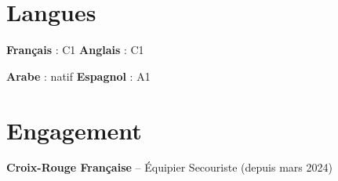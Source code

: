\documentclass[10pt,a4paper]{article}
\newenvironment{resume_list}{\vspace{-2pt}\begin{itemize}[itemsep=0.3pt,parsep=0pt,topsep=0.3pt,leftmargin=18pt]}{\end{itemize}\vspace{-2pt}}
\begin{document}
\vspace{1pt}
\begin{minipage}[t]{0.48\textwidth}
\section{Langues}
\begin{resume_list}
  \item \textbf{Français} : C1 \quad \textbf{Anglais} : C1
  \item \textbf{Arabe} : natif \quad \textbf{Espagnol} : A1
\end{resume_list}
\end{minipage}\hfill
\begin{minipage}[t]{0.48\textwidth}
\section{Engagement}
\begin{resume_list}
  \item \textbf{Croix-Rouge Française} -- Équipier Secouriste (depuis mars 2024)
\end{resume_list}
\end{minipage}
\end{document}
